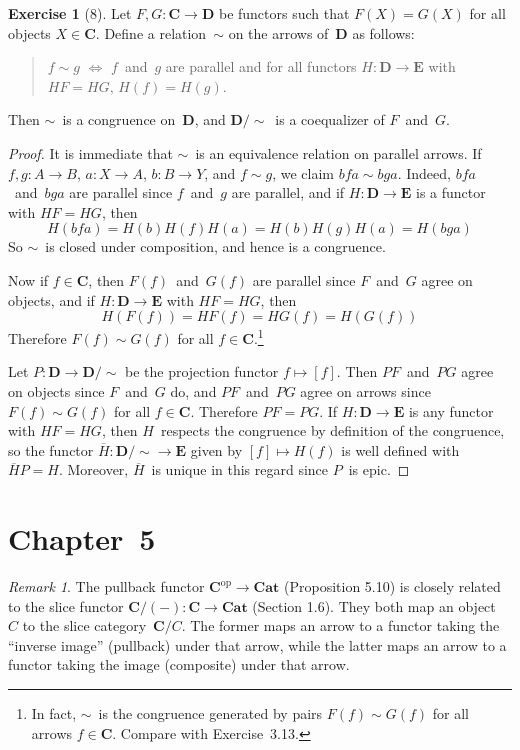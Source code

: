 \documentclass[letterpaper,12pt]{article}
\newcommand{\eq}{\sim}
\newcommand{\cat}[1]{\mathbf{#1}}
\newcommand{\dual}[1]{#1^{\mathrm{op}}}
\newcommand{\C}{\cat{C}}
\newcommand{\Cop}{\dual{\C}}
\newcommand{\D}{\cat{D}}
\newcommand{\E}{\cat{E}}
\newcommand{\Cat}{\cat{Cat}}
\theoremstyle{definition}
\newtheorem*{exer}{Exercise}
\theoremstyle{remark}
\newtheorem*{rmk}{Remark}
\theoremstyle{direction}
\begin{document}
\begin{exer}[8]
Let \(F,G:\C\to\D\) be functors such that \(F(X)=G(X)\) for all objects \(X\in\C\). Define a relation~\(\eq\) on the arrows of~\(\D\) as follows:
\begin{quote}
\(f\eq g\) \(\iff\) \(f\)~and~\(g\) are parallel and for all functors \(H:\D\to\E\) with \(HF=HG\), \(H(f)=H(g)\).
\end{quote}
Then \(\eq\)~is a congruence on~\(\D\), and \(\D/{\eq}\)~is a coequalizer of \(F\)~and~\(G\).
\end{exer}
\begin{proof}
It is immediate that \(\eq\)~is an equivalence relation on parallel arrows. If \(f,g:A\to B\), \(a:X\to A\), \(b:B\to Y\), and \(f\eq g\), we claim \(bfa\eq bga\). Indeed, \(bfa\)~and~\(bga\) are parallel since \(f\)~and~\(g\) are parallel, and if \(H:\D\to\E\) is a functor with \(HF=HG\), then
\[H(bfa)=H(b)H(f)H(a)=H(b)H(g)H(a)=H(bga)\]
So \(\eq\)~is closed under composition, and hence is a congruence.

Now if \(f\in\C\), then \(F(f)\)~and~\(G(f)\) are parallel since \(F\)~and~\(G\) agree on objects, and if \(H:\D\to\E\) with \(HF=HG\), then
\[H(F(f))=HF(f)=HG(f)=H(G(f))\]
Therefore \(F(f)\eq G(f)\) for all \(f\in\C\).\footnote{In fact, \(\eq\)~is the congruence generated by pairs \(F(f)\eq G(f)\) for all arrows \(f\in\C\). Compare with Exercise~3.13.}

Let \(P:\D\to\D/{\eq}\) be the projection functor \(f\mapsto[f]\). Then \(PF\)~and~\(PG\) agree on objects since \(F\)~and~\(G\) do, and \(PF\)~and~\(PG\) agree on arrows since \(F(f)\eq G(f)\) for all \(f\in\C\). Therefore \(PF=PG\). If \(H:\D\to\E\) is any functor with \(HF=HG\), then \(H\)~respects the congruence by definition of the congruence, so the functor \(\overline{H}:\D/{\eq}\to\E\) given by \([f]\mapsto H(f)\) is well defined with \(\overline{H}P=H\). Moreover, \(\overline{H}\)~is unique in this regard since \(P\)~is epic.
\end{proof}

\section*{Chapter~5}
\begin{rmk}
The pullback functor \(\Cop\to\Cat\) (Proposition 5.10) is closely related to the slice functor \(\C/(-):\C\to\Cat\) (Section 1.6). They both map an object~\(C\) to the slice category~\(\C/C\). The former maps an arrow to a functor taking the ``inverse image'' (pullback) under that arrow, while the latter maps an arrow to a functor taking the image (composite) under that arrow.
\end{rmk}
\end{document}
